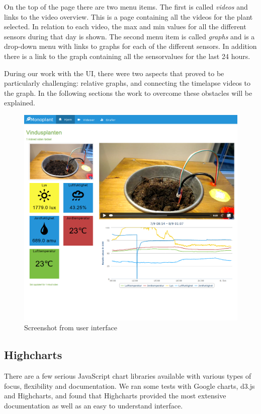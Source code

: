 On the top of the page there are two menu items. The first  is called \emph{videos} and links to the video overview. This is a page containing all the videos for the plant selected. In relation to each video, the max and min values for all the different sensors during that day is shown. The second menu item is called \emph{graphs} and is a drop-down menu with links to graphs for each of the different sensors. In addition there is a link to the graph containing all the sensorvalues for the last 24 hours. 

During our work with the UI, there were two aspects that proved to be particularly challenging: relative graphs, and connecting the timelapse videos to the graph. In the following sections the work to overcome these obstacles will be explained. 

\begin{figure}
\centering
\includegraphics[width=1\textwidth]{img/interface/mainpage.png}
\caption{Screenshot from user interface}
\label{fig:mainpage}
\end{figure}

\subsection{Highcharts}
There are a few serious JavaScript chart libraries available with various types of focus, flexibility and documentation. We ran some tests with Google charts, d3.js and Highcharts, and found that Highcharts provided the most extensive documentation as well as an easy to understand interface. 

